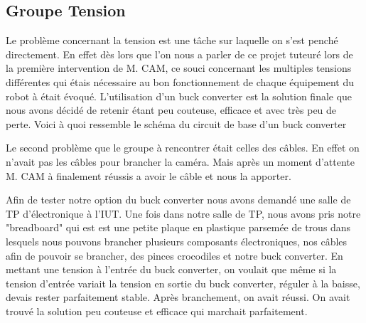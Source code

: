 

\subsection{Groupe Tension}

Le problème concernant la tension est une tâche sur laquelle on s’est penché directement. En effet dès lors que l’on nous a parler de ce projet tuteuré lors de la première intervention de M. CAM, ce souci concernant les multiples tensions différentes qui étais nécessaire au bon fonctionnement de chaque équipement du robot à était évoqué. L’utilisation d’un buck converter est la solution finale que nous avons décidé de retenir étant peu couteuse, efficace et avec très peu de perte. 
Voici à quoi ressemble le schéma du circuit de base d’un buck converter



Le second problème que le groupe à rencontrer était celles des câbles. En effet on n’avait pas les câbles pour brancher la caméra. Mais après un moment d'attente  M. CAM à finalement réussis a avoir le câble et nous la apporter. 
\\

Afin de tester notre option du buck converter nous avons demandé une salle de TP d’électronique à l’IUT. Une fois dans notre salle de TP, nous avons pris notre "breadboard" qui est est une petite plaque en plastique parsemée de trous dans lesquels nous pouvons brancher plusieurs composants électroniques, nos câbles afin de pouvoir se brancher, des pinces crocodiles et notre buck converter. En mettant une tension à l’entrée du buck converter, on voulait que même si la tension d’entrée variait la tension en sortie du buck converter, réguler à la baisse, devais rester parfaitement stable. Après branchement, on avait réussi. On avait trouvé la solution peu couteuse et efficace qui marchait parfaitement.






